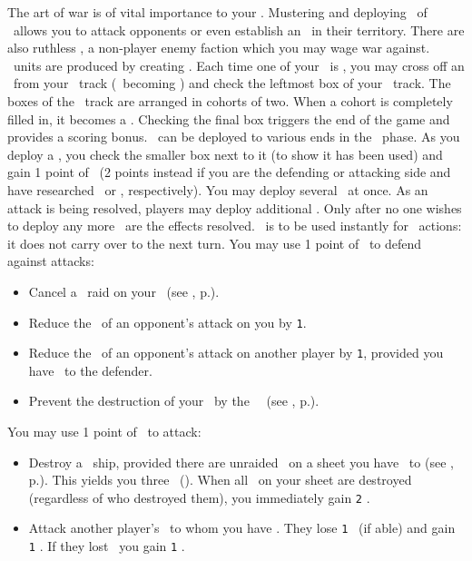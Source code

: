 The art of war is of vital importance to your \planet.  Mustering and deploying \squadrons\ of \starships\ allows you to attack opponents or even establish an \battleship\ in their territory.  There are also ruthless \pirates, a non-player enemy faction which you may wage war against.
\newline\newline
\military\ units are produced by creating \starships.  Each time one of your \starships\ is \activated, you may cross off an \astronaut\ from your \population\ track (\gainastronautsymbol\ becoming \useastronautsymbol) and check the leftmost box of your \military\ track.  The boxes of the \military\ track are arranged in cohorts of two.  When a cohort is completely filled in, it becomes a \squadron.  Checking the final box triggers the end of the game and provides a scoring bonus.
\newline\newline
\squadrons\ can be deployed to various ends in the \deployment\ phase.  As you deploy a \squadron, you check the smaller box next to it (to show it has been used) and gain 1 point of \power\ (2 points instead if you are the defending or attacking side and have researched \shields\ or \lasers, respectively).  You may deploy several \squadrons\ at once.  As an attack is being resolved, players may deploy additional \squadrons.  Only after no one wishes to deploy any more \squadrons\ are the effects resolved.  \power\ is to be used instantly for \military\ actions: it does not carry over to the next turn.
\newline\newline
You may use 1 point of \power\ to defend against attacks:
\begin{itemize}
  \item Cancel a \pirate\ raid on your \planet\ (see , p.\pageref{sec:disasters}).
  \item Reduce the \power\ of an opponent’s attack on you by \texttt{1}.
  \item Reduce the \power\ of an opponent’s attack on another player by \texttt{1}, provided you have \reach\ to the defender.
  \item Prevent the destruction of your \starship\ by the \terrorism\ \disaster\ (see , p.\pageref{sec:disasters}).
\end{itemize}
You may use 1 point of \power\ to attack:
\begin{itemize}
  \item Destroy a \pirate\ ship, provided there are unraided \pirates\ on a sheet you have \reach\ to (see , p.\pageref{sec:reach}).  This yields you three \currency\ (\gaincurrency\gaincurrency\gaincurrency).  When all \pirates\ on your sheet are destroyed (regardless of who destroyed them), you immediately gain \texttt{2} \happiness.
  \item Attack another player’s \planet\ to whom you have \reach.  They lose \texttt{1} \currency\ (if able) and gain \texttt{1} \unhappiness. If they lost \currency\, you gain \texttt{1} \currency.
\end{itemize}
